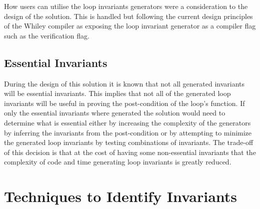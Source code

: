 How users can utilise the loop invariants generators were a
consideration to the design of the solution.
This is handled but following the current design principles of the
Whiley compiler as exposing the loop invariant generator as a compiler
flag such as the verification flag.


\subsection{Essential Invariants}

During the design of this solution it is known that not all generated
invariants will be essential invariants.
This implies that not all of the generated loop invariants will be useful
in proving the post-condition of the loop's function.
If only the essential invariants where generated the solution would need
to determine what is essential either by increasing the complexity of the
generators by inferring the invariants from the post-condition or by
attempting to minimize the generated loop invariants by testing combinations
of invariants.
The trade-off of this decision is that at the cost of having some non-essential
invariants that the complexity of code and time generating loop invariants is
greatly reduced.

\section{Techniques to Identify Invariants}

